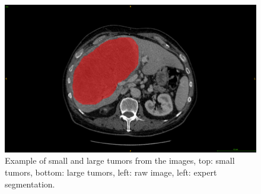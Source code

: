 \begin{figure}[!ht]
\begin{minipage}{0.45\linewidth}
	\end{minipage} \hspace{-0.1cm}
	\begin{minipage}{0.45\linewidth}
		\includegraphics[width=\linewidth]{../Contributions/images/ResizeGDB_examplePatientLargeTumor_seg}
	\end{minipage}
	\caption{Example of small and large tumors from the \textbf{} images, top: small tumors, bottom: large tumors, left: raw image, left: expert segmentation.}
	\label{fig:interdb_tumorSeg_tumorExamples}
\end{figure}
